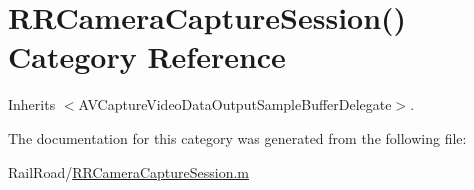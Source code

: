 \hypertarget{category_r_r_camera_capture_session_07_08}{\section{R\-R\-Camera\-Capture\-Session() Category Reference}
\label{category_r_r_camera_capture_session_07_08}
}


Inherits $<$\-A\-V\-Capture\-Video\-Data\-Output\-Sample\-Buffer\-Delegate$>$.



The documentation for this category was generated from the following file\-:\begin{DoxyCompactItemize}
\item 
Rail\-Road/\hyperlink{_r_r_camera_capture_session_8m}{R\-R\-Camera\-Capture\-Session.\-m}\end{DoxyCompactItemize}
